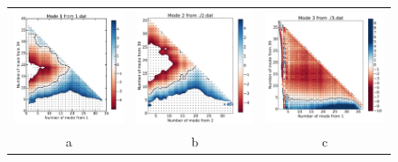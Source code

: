 	\begin{figure}[H]
		\begin{center}
			\begin{tabular}{c c c}
				\includegraphics{image/image/P1-F311} & \includegraphics{image/image/P1-F312} &\includegraphics{image/image/P1-F313} \\
				a &  b &  c \\

\end{tabular}
\end{center}
\end{figure}
